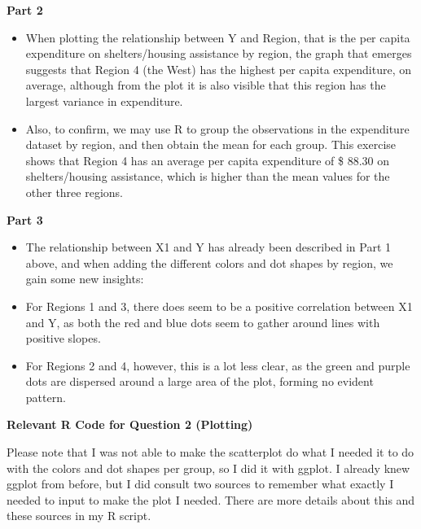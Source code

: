 \documentclass[12pt,letterpaper]{article}
\begin{document}
\newpage

\noindent \textbf {Part 2}

\begin{itemize}
\item When plotting the relationship between Y and Region, that is the per capita expenditure on shelters/housing assistance by region, the graph that emerges suggests that Region 4 (the West) has the highest per capita expenditure, on average, although from the plot it is also visible that this region has the largest variance in expenditure. 
\item Also, to confirm, we may use R to group the observations in the expenditure dataset by region, and then obtain the mean for each group. This exercise shows that Region 4 has an average per capita expenditure of \$ 88.30 on shelters/housing assistance, which is higher than the mean values for the other three regions. 
\end{itemize}

\noindent \textbf {Part 3}

\begin{itemize}
\item The relationship between X1 and Y has already been described in Part 1 above, and when adding the different colors and dot shapes by region, we gain some new insights: 
\item For Regions 1 and 3, there does seem to be a positive correlation between X1 and Y, as both the red and blue dots seem to gather around lines with positive slopes. 
\item For Regions 2 and 4, however, this is a lot less clear, as the green and purple dots are dispersed around a large area of the plot, forming no evident pattern. 
\end{itemize}
 
 \newpage
 
 \noindent \textbf {Relevant R Code for Question 2 (Plotting)}
 
 
 
\noindent Please note that I was not able to make the scatterplot do what I needed it to do with the colors and dot shapes per group, so I did it with ggplot. I already knew ggplot from before, but I did consult two sources to remember what exactly I needed to input to make the plot I needed. There are more details about this and these sources in my R script.

 \newpage
\end{document}
